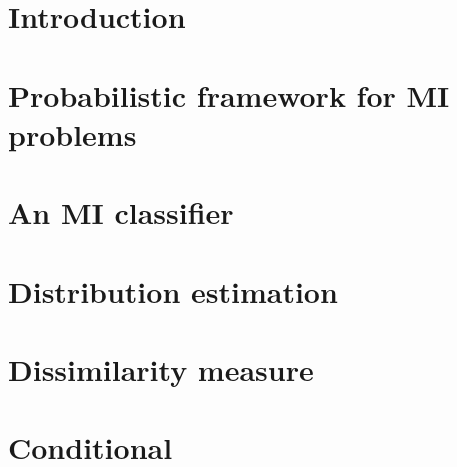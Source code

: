 \documentclass[preprint,12pt]{elsarticle}
\begin{document}
\newcommand{\cpos}{\text{\scriptsize{{\it POS}}}}
\newcommand{\cneg}{\text{\scriptsize{{\it NEG}}}}


\begin{frontmatter}







\end{frontmatter}

\clearpage

\section{Introduction} \label{sec:Introduction} 


\section{Probabilistic framework for MI problems} \label{sec:Probabilistic} 


% 

% 

\section{An MI classifier} \label{sec:Classifier}


\section{Distribution estimation} \label{sec:Distribution}


\section{Dissimilarity measure} \label{sec:Dissimilarity}


\section{Conditional} \label{sec:Conditional}

\end{document}
